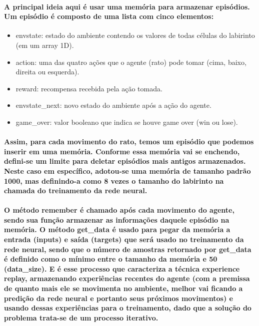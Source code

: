 \documentclass[a4paper]{article}    %
\begin{document}
\paragraph{A principal ideia aqui é usar uma memória para armazenar episódios. Um episódio é composto de uma lista com cinco elementos:}
\begin{itemize}
    \item envstate: estado do ambiente contendo os valores de todas células do labirinto (em um array 1D).
    \item action: uma das quatro ações que o agente (rato) pode tomar (cima, baixo, direita ou esquerda).
    \item reward: recompensa recebida pela ação tomada.
    \item envstate\_next: novo estado do ambiente após a ação do agente.
    \item game\_over: valor booleano que indica se houve game over (win ou lose).
\end{itemize}

\paragraph{Assim, para cada movimento do rato, temos um episódio que podemos inserir em uma memória. Conforme essa memória vai se enchendo, defini-se um limite para deletar episódios mais antigos armazenados. Neste caso em específico, adotou-se uma memória de tamanho padrão 1000, mas definindo-a como 8 vezes o tamanho do labirinto na chamada do treinamento da rede neural.}

\paragraph{O método remember é chamado após cada movimento do agente, sendo sua função armazenar as informações daquele episódio na memória. O método get\_data é usado para pegar da memória a entrada (inputs) e saída (targets) que será usado no treinamento da rede neural, sendo que o número de amostras retornado por get\_data é definido como o mínimo entre o tamanho da memória e 50 (data\_size). E é esse processo que caracteriza a técnica experience replay, armazenando experiências recentes do agente (com a premissa de quanto mais ele se movimenta no ambiente, melhor vai ficando a predição da rede neural e portanto seus próximos movimentos) e usando dessas experiências para o treinamento, dado que a solução do problema trata-se de um processo iterativo.}
\end{document}
